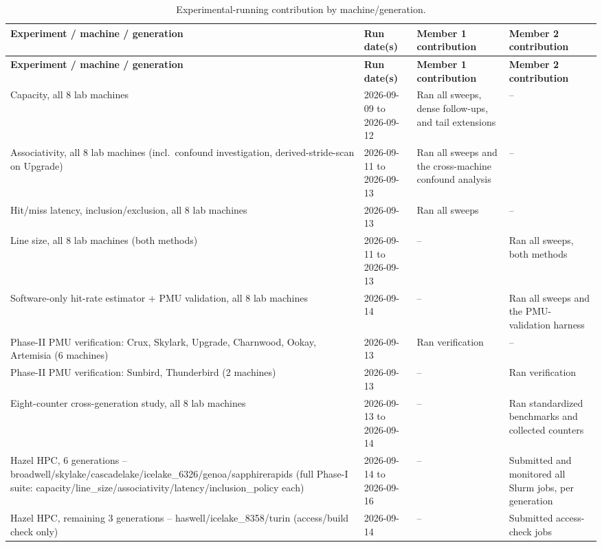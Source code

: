 \documentclass{article}
\begin{document}
\begin{longtable}{|p{4.5cm}|p{3cm}|p{4cm}|p{4cm}|}
\caption{Experimental-running contribution by machine/generation.}
\label{tab:experimental-contributions} \\

\hline
\textbf{Experiment / machine / generation} &
\textbf{Run date(s)} &
\textbf{Member 1 contribution} &
\textbf{Member 2 contribution} \\
\hline
\endfirsthead

\hline
\textbf{Experiment / machine / generation} &
\textbf{Run date(s)} &
\textbf{Member 1 contribution} &
\textbf{Member 2 contribution} \\
\hline
\endhead

Capacity, all 8 lab machines & 2026-09-09 to 2026-09-12 & Ran all sweeps, dense follow-ups, and tail extensions & -- \\
\hline

Associativity, all 8 lab machines (incl.\ confound investigation, derived-stride-scan on Upgrade) & 2026-09-11 to 2026-09-13 & Ran all sweeps and the cross-machine confound analysis & -- \\
\hline

Hit/miss latency, inclusion/exclusion, all 8 lab machines & 2026-09-13 & Ran all sweeps & -- \\
\hline

Line size, all 8 lab machines (both methods) & 2026-09-11 to 2026-09-13 & -- & Ran all sweeps, both methods \\
\hline

Software-only hit-rate estimator + PMU validation, all 8 lab machines & 2026-09-14 & -- & Ran all sweeps and the PMU-validation harness \\
\hline

Phase-II PMU verification: Crux, Skylark, Upgrade, Charnwood, Ookay, Artemisia (6 machines) & 2026-09-13 & Ran verification & -- \\
\hline

Phase-II PMU verification: Sunbird, Thunderbird (2 machines) & 2026-09-13 & -- & Ran verification \\
\hline

Eight-counter cross-generation study, all 8 lab machines & 2026-09-13 to 2026-09-14 & -- & Ran standardized benchmarks and collected counters \\
\hline

Hazel HPC, 6 generations -- broadwell/skylake/cascadelake/icelake\_6326/genoa/sapphirerapids (full Phase-I suite: capacity/line\_size/associativity/latency/inclusion\_policy each) & 2026-09-14 to 2026-09-16 & -- & Submitted and monitored all Slurm jobs, per generation \\
\hline

Hazel HPC, remaining 3 generations -- haswell/icelake\_8358/turin (access/build check only) & 2026-09-14 & -- & Submitted access-check jobs \\
\hline

\end{longtable}
\end{document}
